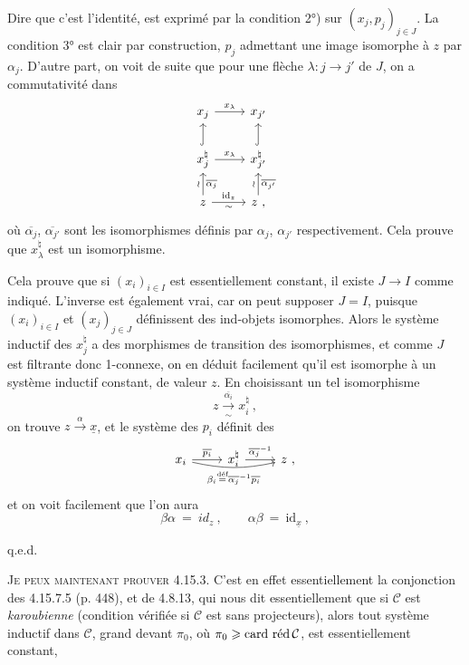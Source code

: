 
Dire que c'est l'identité, est exprimé par la condition 2°) sur $(x_j,p_j)_{j\in J}$. La condition 3° est clair par construction, $p_j$ admettant une image isomorphe à $z$ par $\alpha_j$. D'autre part, on voit de suite que pour une flèche $\lambda : j \longrightarrow j'$ de $J$, on a commutativité dans %
\[
\begin{tikzcd}
x_j \arrow[r, "x_\lambda"] & x_{j'} \\
x_j^\natural \arrow[u, hook] \arrow[r, "x_\lambda"] & x_{j'}^\natural \arrow[u, hook] \\
z \arrow[u, "\wr", "\overline{\alpha_j}"'] \arrow[r, "\mathrm{id}_z", "\sim"'] & z \ , \arrow[u, "\wr", "\overline{\alpha_{j'}}"']
\end{tikzcd}
\]
où $\overline{\alpha_j}$, $\overline{\alpha_{j'}}$ sont les isomorphismes définis par $\alpha_j$, $\alpha_{j'}$ respectivement. Cela prouve que $x_\lambda^\natural$ est un isomorphisme.

Cela prouve que si $(x_i)_{i\in I}$ est essentiellement constant, il existe $J\longrightarrow I$ comme indiqué. L'inverse est également vrai, car on peut supposer $J = I$, puisque $(x_i)_{i\in I}$ et $(x_j)_{j\in J}$ définissent des ind-objets isomorphes. Alors le système inductif des $x_j^\natural$ a des morphismes de transition des isomorphismes, et comme $J$ est filtrante donc 1-connexe, on en déduit facilement qu'il est isomorphe
à un système inductif constant, de valeur $z$. En choisissant un tel isomorphisme
\[
z \xrightarrow[\sim]{\overline{\alpha_i}} x_i^\natural \ ,
\]
on trouve $z \xrightarrow{\alpha} \underline{x}$, et le système des $p_i$ définit des
\[
\begin{tikzcd}
x_i \arrow[r, "\overline{p_i}"] \arrow[rr, bend right=12, "\beta_i \overset{\text{déf}}{=} \overline{\alpha_j}^{-1}\overline{p_i}"'] & x_i^\natural \arrow[r, "\overline{\alpha_j}^{-1}"] & z \ ,
\end{tikzcd}
\] %
et on voit facilement que l'on aura
\[
\beta\alpha \ = \ id_z \ , \qquad \alpha\beta \ = \ \mathrm{id}_{\underline{x}} \ ,
\]

\hfill q.e.d.

\textsc{Je peux maintenant prouver} 4.15.3. C'est en effet essentiellement la conjonction des 4.15.7.5 (p. 448), et de 4.8.13, qui nous dit essentiellement que si $\mathcal{C}$ est \textit{karoubienne} (condition vérifiée si $\mathcal{C}$ est sans projecteurs), alors tout système inductif dans $\mathcal{C}$, grand devant $\pi_0$, où $\pi_0 \geqslant \operatorname{card}\,\text{réd}\,\mathcal{C}$, est essentiellement constant,

